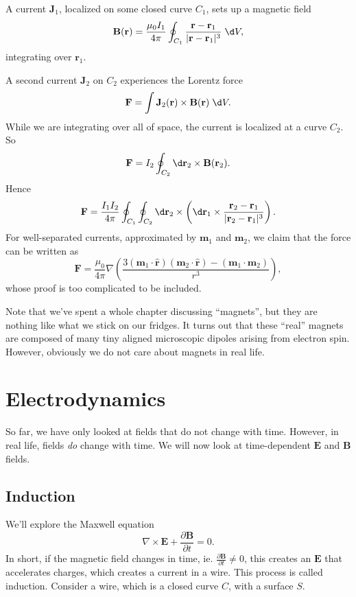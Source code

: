\documentclass[a4paper]{article}
\begin{document}
\begin{eg}
  A current $\mathbf{J}_1$, localized on some closed curve $C_1$, sets up a magnetic field
  \[
    \mathbf{B}(\mathbf{r}) = \frac{\mu_0I_1}{4\pi}\oint_{C_1} \frac{\mathbf{r} - \mathbf{r}_1}{|\mathbf{r} - \mathbf{r}_1|^3}\;\d V,
  \]
  integrating over $\mathbf{r}_1$.

  A second current $\mathbf{J}_2$ on $C_2$ experiences the Lorentz force
  \[
    \mathbf{F} = \int \mathbf{J}_2(\mathbf{r})\times \mathbf{B}(\mathbf{r})\;\d V.
  \]
  While we are integrating over all of space, the current is localized at a curve $C_2$. So
  \[
    \mathbf{F} = I_2\oint_{C_2} \d \mathbf{r}_2 \times \mathbf{B}(\mathbf{r}_2).
  \]
  Hence
  \[
    \mathbf{F} = \frac{I_1 I_2}{4\pi}\oint_{C_1}\oint_{C_2}\d \mathbf{r}_2\times \left(\d \mathbf{r}_1\times \frac{\mathbf{r}_2 - \mathbf{r}_1}{|\mathbf{r}_2 - \mathbf{r}_1|^3}\right).
  \]
  For well-separated currents, approximated by $\mathbf{m}_1$ and $\mathbf{m}_2$, we claim that the force can be written as
  \[
    \mathbf{F} = \frac{\mu_0}{4\pi}\nabla\left(\frac{3(\mathbf{m}_1\cdot \hat{\mathbf{r}})(\mathbf{m}_2\cdot \hat{\mathbf{r}}) - (\mathbf{m}_1\cdot \mathbf{m}_2)}{r^3}\right),
  \]
  whose proof is too complicated to be included.
\end{eg}

Note that we've spent a whole chapter discussing ``magnets'', but they are nothing like what we stick on our fridges. It turns out that these ``real'' magnets are composed of many tiny aligned microscopic dipoles arising from electron spin. However, obviously we do not care about magnets in real life.

\section{Electrodynamics}
So far, we have only looked at fields that do not change with time. However, in real life, fields \emph{do} change with time. We will now look at time-dependent $\mathbf{E}$ and $\mathbf{B}$ fields.
\subsection{Induction}
We'll explore the Maxwell equation
\[
  \nabla\times \mathbf{E} + \frac{\partial \mathbf{B}}{\partial t} = 0.
\]
In short, if the magnetic field changes in time, ie. $\frac{\partial \mathbf{B}}{\partial t} \not = 0$, this creates an $\mathbf{E}$ that accelerates charges, which creates a current in a wire. This process is called induction. Consider a wire, which is a closed curve $C$, with a surface $S$.
\end{document}
